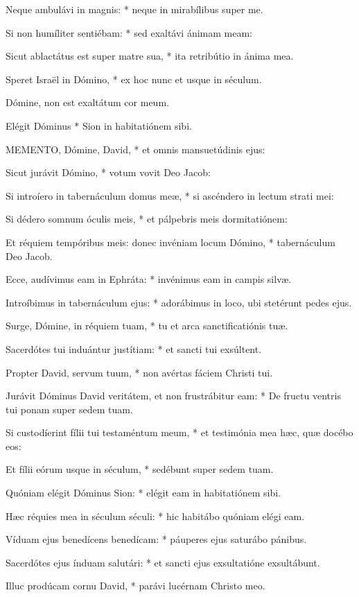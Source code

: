 Neque ambulávi in magnis: * neque in mirabílibus super me.

Si non humíliter sentiébam: * sed exaltávi ánimam meam:

Sicut ablactátus est super matre sua, * ita retribútio in ánima mea.

Speret Israël in Dómino, * ex hoc nunc et usque in séculum.

 Dómine, non est exaltátum cor meum.

 Elégit Dóminus * Sion in habitatiónem sibi.


\lettrine[lines=2]{M}{EMENTO}, Dómine, David, * et omnis mansuetúdinis ejus:

Sicut jurávit Dómino, * votum vovit Deo Jacob:

Si introíero in tabernáculum domus meæ, * si ascéndero in lectum strati mei:

Si dédero somnum óculis meis, * et pálpebris meis dormitatiónem:

Et réquiem tempóribus meis: donec invéniam locum Dómino, * tabernáculum Deo Jacob.

Ecce, audívimus eam in Ephráta: * invénimus eam in campis silvæ.

Introíbimus in tabernáculum ejus: * adorábimus in loco, ubi stetérunt pedes ejus.

Surge, Dómine, in réquiem tuam, * tu et arca sanctificatiónis tuæ.

Sacerdótes tui induántur justítiam: * et sancti tui exsúltent.

Propter David, servum tuum, * non avértas fáciem Christi tui.

Jurávit Dóminus David veritátem, et non frustrábitur eam: * De fructu ventris tui ponam super sedem tuam.

Si custodíerint fílii tui testaméntum meum, * et testimónia mea hæc, quæ docébo eos:

Et fílii eórum usque in séculum, * sedébunt super sedem tuam.

Quóniam elégit Dóminus Sion: * elégit eam in habitatiónem sibi.

Hæc réquies mea in séculum séculi: * hic habitábo quóniam elégi eam.

Víduam ejus benedícens benedícam: * páuperes ejus saturábo pánibus.

Sacerdótes ejus índuam salutári: * et sancti ejus exsultatióne exsultábunt.

Illuc prodúcam cornu David, * parávi lucérnam Christo meo.

